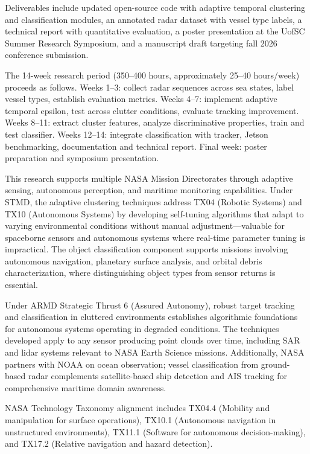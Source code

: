 \documentclass[12pt]{article}
\newcommand{\sect}[1]{\noindent{\color{garnet}\textbf{\textsc{#1}}.}}
\begin{document}
Deliverables include updated open-source code with adaptive temporal clustering and classification modules, an annotated radar dataset with vessel type labels, a technical report with quantitative evaluation, a poster presentation at the UofSC Summer Research Symposium, and a manuscript draft targeting fall 2026 conference submission.

\sect{Timeline}
The 14-week research period (350--400 hours, approximately 25--40 hours/week) proceeds as follows. Weeks 1--3: collect radar sequences across sea states, label vessel types, establish evaluation metrics. Weeks 4--7: implement adaptive temporal epsilon, test across clutter conditions, evaluate tracking improvement. Weeks 8--11: extract cluster features, analyze discriminative properties, train and test classifier. Weeks 12--14: integrate classification with tracker, Jetson benchmarking, documentation and technical report. Final week: poster preparation and symposium presentation.

\sect{NASA Relevance}
This research supports multiple NASA Mission Directorates through adaptive sensing, autonomous perception, and maritime monitoring capabilities. Under STMD, the adaptive clustering techniques address TX04 (Robotic Systems) and TX10 (Autonomous Systems) by developing self-tuning algorithms that adapt to varying environmental conditions without manual adjustment---valuable for spaceborne sensors and autonomous systems where real-time parameter tuning is impractical. The object classification component supports missions involving autonomous navigation, planetary surface analysis, and orbital debris characterization, where distinguishing object types from sensor returns is essential.

Under ARMD Strategic Thrust 6 (Assured Autonomy), robust target tracking and classification in cluttered environments establishes algorithmic foundations for autonomous systems operating in degraded conditions. The techniques developed apply to any sensor producing point clouds over time, including SAR and lidar systems relevant to NASA Earth Science missions. Additionally, NASA partners with NOAA on ocean observation; vessel classification from ground-based radar complements satellite-based ship detection and AIS tracking for comprehensive maritime domain awareness.

NASA Technology Taxonomy alignment includes TX04.4 (Mobility and manipulation for surface operations), TX10.1 (Autonomous navigation in unstructured environments), TX11.1 (Software for autonomous decision-making), and TX17.2 (Relative navigation and hazard detection).
\end{document}
